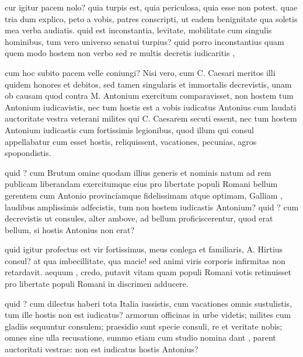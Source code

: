  cur igitur pacem nolo? quia turpis est, quia periculosa, quia esse non potest. quae tria dum explico, peto a vobis, patres conscripti, ut eadem benignitate qua soletis mea verba audiatis. quid est inconstantia, levitate, mobilitate cum singulis hominibus, tum vero universo senatui turpius? quid porro inconstantius quam quem modo hostem non verbo sed re multis decretis iudicaritis ,

 cum hoc subito pacem velle coniungi? Nisi vero, cum C. Caesari meritos illi quidem honores et debitos, sed tamen singularis et immortalis decrevistis, unam ob causam quod contra M. Antonium exercitum comparavisset, non hostem tum Antonium iudicavistis, nec tum hostis est a vobis iudicatus Antonius cum laudati auctoritate vestra veterani milites qui C. Caesarem secuti essent, nec tum hostem Antonium iudicastis cum fortissimis legionibus, quod illum qui consul appellabatur cum esset hostis, reliquissent, vacationes, pecunias, agros spopondistis.

 quid ? cum Brutum omine quodam illius generis et nominis natum ad rem publicam liberandam exercitumque eius pro libertate populi Romani bellum gerentem cum Antonio provinciamque fidelissimam atque optimam, Galliam , laudibus amplissimis adfecistis, tum non hostem iudicastis Antonium? quid ? cum decrevistis ut consules, alter ambove, ad bellum proficiscerentur, quod erat bellum, si hostis Antonius non erat?

 quid igitur profectus est vir fortissimus, meus conlega et familiaris, A. Hirtius consul? at qua imbecillitate, qua macie! sed animi viris corporis infirmitas non retardavit. aequum , credo, putavit vitam quam populi Romani votis retinuisset pro libertate populi Romani in discrimen adducere.

 quid ? cum dilectus haberi tota Italia iussistis, cum vacationes omnis sustulistis, tum ille hostis non est iudicatus? armorum officinas in urbe videtis; milites cum gladiis sequuntur consulem; praesidio sunt specie consuli, re et veritate nobis; omnes sine ulla recusatione, summo etiam cum studio nomina dant , parent auctoritati vestrae: non est iudicatus hostis Antonius?

